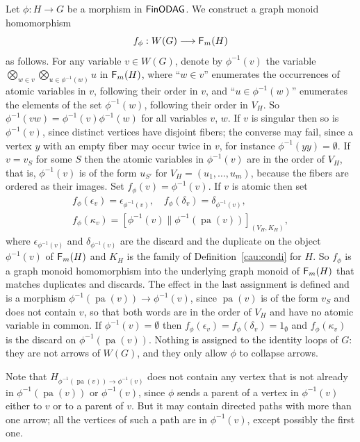 \documentclass[12pt]{amsart}
\theoremstyle{plain}
\theoremstyle{definition}
\theoremstyle{remark}
\numberwithin{equation}{section}
\theoremstyle{plain}
\newcommand{\0}{\emptyset}
\newcommand{\fun}{\longrightarrow}
\newcommand{\cat}[1]{\textup{\textsf{#1}}}
\DeclareMathOperator{\cau}{\cat F_{\text{$m$}}}
\DeclareMathOperator{\pa}{pa}
\begin{document}
Let $\phi : H \fun G$ be a morphism in $\cat{FinODAG}$. We construct a graph monoid homomorphism
\[
f_\phi : W(G) \fun \cau(H)
\]
as follows. For any variable $v \in W(G)$, denote by $\phi^{-1}(v)$  the variable $\bigotimes_{w \in v} \bigotimes_{u \in \phi^{-1}(w)} u$ in $\cau(H)$, where ``$w \in v$'' enumerates the occurrences of atomic variables in $v$, following their order in $v$,  and  ``$u \in \phi^{-1}(w)$'' enumerates the  elements of the set $\phi^{-1}(w)$, following their order in $V_H$. So $\phi^{-1}(v w) = \phi^{-1}(v) \phi^{-1}(w)$ for all variables $v$, $w$. If $v$ is singular then so is $\phi^{-1}(v)$, since distinct vertices have disjoint fibers; the converse may fail, since a vertex $y$ with an empty fiber may occur twice in $v$, for instance $\phi^{-1}(yy) = \0$. If $v = v_S$ for some $S$ then the atomic variables in $\phi^{-1}(v)$ are in the order of $V_H$, that is, $\phi^{-1}(v)$ is of the form $u_{S'}$ for $V_H = (u_1, \ldots, u_m)$, because the fibers are ordered as their images. Set $f_\phi(v) = \phi^{-1}(v)$. If $v$ is atomic  then set
\begin{equation}\label{sub:fun:gen}
\begin{gathered}
 f_\phi(\epsilon_v ) = \epsilon_{\phi^{-1}(v)}, \quad f_\phi(\delta_v ) = \delta_{\phi^{-1}(v)}, \\
 f_\phi(\kappa_v) = [\phi^{-1}(v) \| \phi^{-1}(\pa(v))]_{(V_H, K_H)},
\end{gathered}
\end{equation}
where $\epsilon_{\phi^{-1}(v)}$ and $\delta_{\phi^{-1}(v)}$ are the discard and the duplicate on the object $\phi^{-1}(v)$ of $\cau(H)$ and $K_H$ is the family of Definition~\ref{cau:condi} for $H$. So $f_\phi$ is a graph monoid homomorphism into the underlying graph monoid of $\cau(H)$ that matches duplicates and discards. The effect in the last assignment is defined and is a morphism $\phi^{-1}(\pa(v)) \fun \phi^{-1}(v)$, since $\pa(v)$ is of the form $v_S$ and does not contain $v$, so that both words are in the order of $V_H$ and have no atomic variable in common. If $\phi^{-1}(v) = \0$ then $f_\phi(\epsilon_v) = f_\phi(\delta_v) = 1_\0$ and $f_\phi(\kappa_v)$ is the discard on $\phi^{-1}(\pa(v))$. Nothing is assigned to the identity loops of $G$: they are not arrows of $W(G)$, and they only allow $\phi$ to collapse arrows.

Note that $H_{\phi^{-1}(\pa(v)) \rightarrow \phi^{-1}(v)}$ does not contain any vertex that is not already in $\phi^{-1}(\pa(v))$ or $\phi^{-1}(v)$, since $\phi$ sends a parent of a vertex in $\phi^{-1}(v)$ either to $v$ or to a parent of $v$. But it may contain directed paths with more than one arrow; all the vertices of such a path are in $\phi^{-1}(v)$, except possibly the first one.
\end{document}
